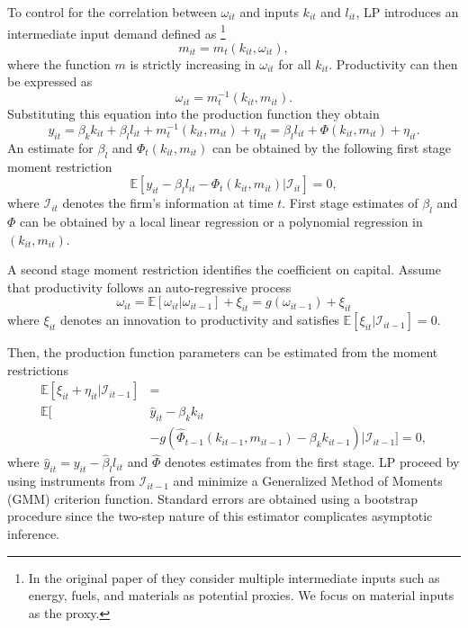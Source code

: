 \documentclass[11pt]{article}
\begin{document}
To control for the correlation between $\omega_{it}$ and inputs $k_{it}$ and $l_{it}$, LP introduces an intermediate input demand defined as \footnote{In the original paper of \cite{Levinsohn2003} they consider multiple intermediate inputs such as energy, fuels, and materials as potential proxies. We focus on material inputs as the proxy.}
\begin{equation}
m_{it}=m_{t}(k_{it}, \omega_{it}),
\end{equation}
where the function $m$ is strictly increasing in $\omega_{it}$ for all $k_{it}$. Productivity can then be expressed as
\begin{equation}
\omega_{it}=m_{t}^{-1}(k_{it}, m_{it}).
\end{equation}
Substituting this equation into the production function they obtain
\begin{equation}
y_{it}=\beta_{k}k_{it}+\beta_{l}l_{it}+m^{-1}_{t}(k_{it}, m_{it})+\eta_{it}=\beta_{l}l_{it}+\Phi(k_{it}, m_{it})+\eta_{it}.
\end{equation}
An estimate for $\beta_{l}$ and $\Phi_{t}(k_{it}, m_{it})$ can be obtained by the following first stage moment restriction
\begin{equation}
\mathbb{E}[y_{it}-\beta_{l}l_{it}-\Phi_{t}(k_{it}, m_{it})|\mathcal{I}_{it}]=0,
\end{equation}
where $\mathcal{I}_{it}$ denotes the firm's information at time $t$. First stage estimates of $\beta_{l}$ and $\Phi$ can be obtained by a local linear regression or a polynomial regression in $(k_{it}, m_{it})$.

A second stage moment restriction identifies the coefficient on capital. Assume that productivity follows an auto-regressive process
\begin{equation}
\omega_{it}=\mathbb{E}[\omega_{it}|\omega_{it-1}]+\xi_{it}=g(\omega_{it-1})+\xi_{it}
\end{equation}
where $\xi_{it}$ denotes an innovation to productivity and satisfies $\mathbb{E}[\xi_{it}|\mathcal{I}_{it-1}]=0$.

Then, the production function parameters can be estimated from the moment restrictions
\begin{equation}
\begin{split}
\mathbb{E}[\xi_{it}+\eta_{it}|\mathcal{I}_{it-1}]&=\\
\mathbb{E}[&\hat{y}_{it}-\beta_{k}k_{it}\\
&-g(\hat{\Phi}_{t-1}(k_{it-1}, m_{it-1})-\beta_{k}k_{it-1})|\mathcal{I}_{it-1}]=0,
\end{split}
\end{equation}
where $\hat{y}_{it}=y_{it}-\hat{\beta}_{l}l_{it}$ and $\hat{\Phi}$ denotes estimates from the first stage. LP proceed by using instruments from $\mathcal{I}_{it-1}$ and minimize a Generalized Method of Moments (GMM) criterion function. Standard errors are obtained using a bootstrap procedure since the two-step nature of this estimator complicates asymptotic inference.
\end{document}
